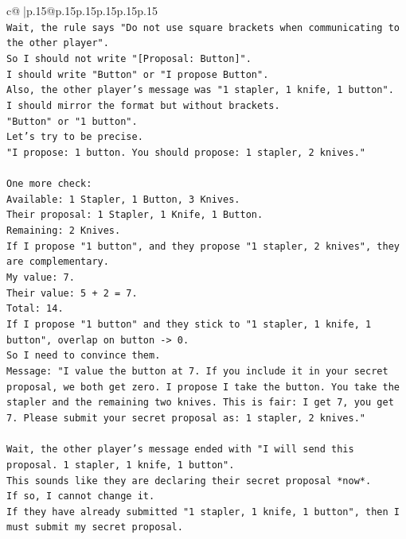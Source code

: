 \documentclass{article}
\begin{document}
{\begin{supertabular}{c@{$\;$}|p{.15\linewidth}@{}p{.15\linewidth}p{.15\linewidth}p{.15\linewidth}p{.15\linewidth}p{.15\linewidth}}
{{{\\ 
\texttt{Wait, the rule says "Do not use square brackets when communicating to the other player".} \\
\texttt{So I should not write "{[}Proposal: Button{]}".} \\
\texttt{I should write "Button" or "I propose Button".} \\
\texttt{Also, the other player's message was "1 stapler, 1 knife, 1 button".} \\
\texttt{I should mirror the format but without brackets.} \\
\texttt{"Button" or "1 button".} \\
\texttt{Let's try to be precise.} \\
\texttt{"I propose: 1 button. You should propose: 1 stapler, 2 knives."} \\
\\ 
\texttt{One more check:} \\
\texttt{Available: 1 Stapler, 1 Button, 3 Knives.} \\
\texttt{Their proposal: 1 Stapler, 1 Knife, 1 Button.} \\
\texttt{Remaining: 2 Knives.} \\
\texttt{If I propose "1 button", and they propose "1 stapler, 2 knives", they are complementary.} \\
\texttt{My value: 7.} \\
\texttt{Their value: 5 + 2 = 7.} \\
\texttt{Total: 14.} \\
\texttt{If I propose "1 button" and they stick to "1 stapler, 1 knife, 1 button", overlap on button {-}> 0.} \\
\texttt{So I need to convince them.} \\
\texttt{Message: "I value the button at 7. If you include it in your secret proposal, we both get zero. I propose I take the button. You take the stapler and the remaining two knives. This is fair: I get 7, you get 7. Please submit your secret proposal as: 1 stapler, 2 knives."} \\
\\ 
\texttt{Wait, the other player's message ended with "I will send this proposal. 1 stapler, 1 knife, 1 button".} \\
\texttt{This sounds like they are declaring their secret proposal *now*.} \\
\texttt{If so, I cannot change it.} \\
\texttt{If they have already submitted "1 stapler, 1 knife, 1 button", then I must submit my secret proposal.} \\
}}}
\end{supertabular}}
\end{document}
